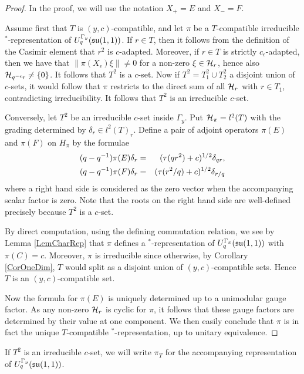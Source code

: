 \begin{proof} In the proof, we will use the notation $X_+ = E$ and $X_- = F$.

Assume first that $T$ is $(y,c)$-compatible, and let $\pi$ be a $T$-compatible irreducible $^*$-representation of $U_q^{\Gamma_y}(\mathfrak{su}(1,1))$. If $r\in T$, then it follows from the definition of the Casimir element that $r^2$ is $c$-adapted. Moreover, if $r\in T$ is strictly $c_{\epsilon}$-adapted, then we have that $\|\pi(X_{\epsilon})\xi\|\neq 0$ for a non-zero $\xi\in \mathcal{H}_r$, hence also $\mathcal{H}_{q^{-\epsilon}r}\neq \{0\}$. It follows that $T^2$ is a $c$-set. Now if $T^2=T_1^2\cup T_2^2$ a disjoint union of $c$-sets, it would follow that $\pi$ restricts to the direct sum of all $\mathcal{H}_r$ with $r\in T_1$, contradicting irreducibility. It follows that $T^2$ is an irreducible $c$-set.

Conversely, let $T^2$ be an irreducible $c$-set inside $\Gamma_y$. Put $\mathcal{H}_{\pi} = l^2(T)$ with the grading determined by $\delta_{r}\in l^2(T)_r$. Define a pair of adjoint operators $\pi(E)$ and $\pi(F)$ on $H_{\pi}$ by the formulae \begin{eqnarray}\label{EqFormRepPlus} (q-q^{-1})\pi(E)  \delta_{r} &=&  (\operatorname{\tau}(qr^2)+c)^{1/2}\delta_{qr},\\ (q-q^{-1})\pi(F)  \delta_{r} &=&  (\operatorname{\tau}(r^2/q)+c)^{1/2}\delta_{r/q} \end{eqnarray} where a right hand side is considered as the zero vector when the accompanying scalar factor is zero. Note that the roots on the right hand side are well-defined precisely because $T^2$ is a $c$-set. 

By direct computation, using the defining commutation relation, we see by Lemma \ref{LemCharRep} that $\pi$ defines a $^*$-representation of $U_q^{\Gamma_x}(\mathfrak{su}(1,1))$ with $\pi(C) =c$. Moreover, $\pi$ is irreducible since otherwise, by Corollary \ref{CorOneDim}, $T$ would split as a disjoint union of $(y,c)$-compatible sets. Hence $T$ is an $(y,c)$-compatible set.

Now the formula for $\pi(E)$ is uniquely determined up to a unimodular gauge factor. As any non-zero $\mathcal{H}_r$ is cyclic for $\pi$, it follows that these gauge factors are determined by their value at one component. We then easily conclude that $\pi$ is in fact the unique $T$-compatible $^*$-representation, up to unitary equivalence.
\end{proof}

If $T^2$ is an irreducible $c$-set, we will write $\pi_T$ for the accompanying representation of $U_q^{\Gamma_y}(\mathfrak{su}(1,1))$. 

